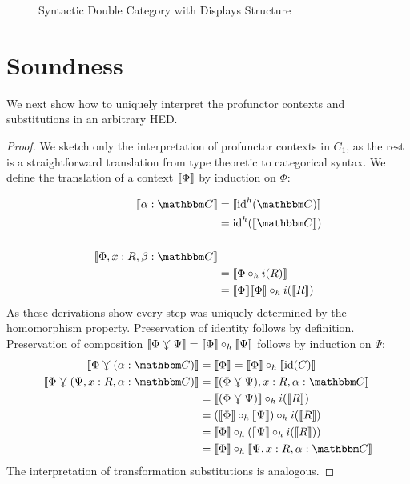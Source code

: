 \documentclass{llncs}
\begin{document}
\begin{figure}
  \caption{Syntactic Double Category with Displays Structure}
\end{figure}

\section{Soundness}

We next show how to uniquely interpret the profunctor contexts and
substitutions in an arbitrary HED.

\begin{proof}
  We sketch only the interpretation of profunctor contexts in $C_1$,
  as the rest is a straightforward translation from type theoretic to
  categorical syntax.  We define the translation of a context
  $\llbracket{\Phi}\rrbracket$ by induction on $\Phi$:

  \begin{align*}
    \sem{\alpha:\cat C} &= \sem{\id^h(\cat C)}\\
    &= \id^h(\sem{\cat C})\\\\
    \sem{\Phi , x:R, \beta:\cat C}\\
    &= \sem{\Phi \circ_h i(R)}\\
    &= \sem{\Phi} \sem{\Phi} \circ_h i(\sem{R})
  \end{align*}
  As these derivations show every step was uniquely determined by the
  homomorphism property. Preservation of identity follows by
  definition. Preservation of composition $\llbracket{\Phi \curlyveedownarrow\Psi}\rrbracket =
  \llbracket{\Phi}\rrbracket \circ_h \llbracket{\Psi}\rrbracket$ follows by induction on $\Psi$:
  \begin{align*}
    \sem{\Phi \jnctx (\alpha:\cat C)} &= \sem{\Phi} = \sem{\Phi} \circ_h \sem{\id(C)}\\
    \sem{\Phi \jnctx (\Psi,x:R,\alpha:\cat C)}
    &= \sem{(\Phi \jnctx \Psi),x:R,\alpha:\cat C} \\
    &= \sem{(\Phi \jnctx \Psi)} \circ_h i(\sem{R})\\
    &= (\sem{\Phi} \circ_h \sem{\Psi}) \circ_h i(\sem{R})\\
    &= \sem{\Phi} \circ_h (\sem{\Psi} \circ_h i(\sem{R}))\\
    &= \sem{\Phi} \circ_h \sem{\Psi, x:R, \alpha:\cat C}
  \end{align*}
  The interpretation of transformation substitutions is analogous.
\end{proof}
\end{document}
